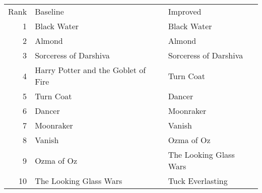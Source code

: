 \begin{tabular}{rll}
Rank & Baseline & Improved \\
1 & Black Water & Black Water \\
2 & Almond & Almond \\
3 & Sorceress of Darshiva & Sorceress of Darshiva \\
4 & Harry Potter and the Goblet of Fire & Turn Coat \\
5 & Turn Coat & Dancer \\
6 & Dancer & Moonraker \\
7 & Moonraker & Vanish \\
8 & Vanish & Ozma of Oz \\
9 & Ozma of Oz & The Looking Glass Wars \\
10 & The Looking Glass Wars & Tuck Everlasting \\
\end{tabular}
